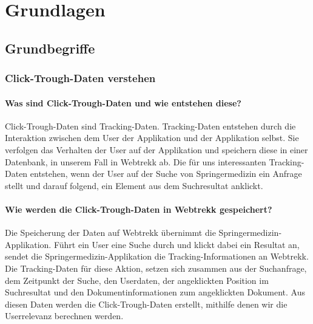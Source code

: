 %
\chapter{Grundlagen}
\label{sec:Grundlagen}

\section{Grundbegriffe}
\label{sec:Grundlagen:Grundbegriffe}

\subsection{Click-Trough-Daten verstehen}
\label{sec:Grundlagen:Grundbegriffe:Click-Trough-Daten}

\subsubsection{Was sind Click-Trough-Daten und wie entstehen diese?}
\label{sec:Grundlagen:Grundbegriffe:Click-Trough-Daten:WasSindClick-Trough-Daten}

Click-Trough-Daten sind Tracking-Daten. Tracking-Daten entstehen durch die Interaktion zwischen dem User der Applikation und der Applikation selbst. Sie verfolgen das Verhalten der User auf der Applikation und speichern diese in einer Datenbank, in unserem Fall in Webtrekk ab. Die für uns interessanten Tracking-Daten entstehen, wenn der User auf der Suche von Springermedizin ein Anfrage stellt und darauf folgend, ein Element aus dem Suchresultat anklickt.

\subsubsection{Wie werden die Click-Trough-Daten in Webtrekk gespeichert?}
\label{sec:Grundlagen:Grundbegriffe:Click-Trough-Daten:SpeichernClick-Trough-Daten}

Die Speicherung der Daten auf Webtrekk übernimmt die Springermedizin-Applikation. Führt ein User eine Suche durch und klickt dabei ein Resultat an, sendet die Springermedizin-Applikation die Tracking-Informationen an Webtrekk. Die Tracking-Daten für diese Aktion, setzen sich zusammen aus der Suchanfrage, dem Zeitpunkt der Suche, den Userdaten, der angeklickten Position im Suchresultat und den Dokumentinformationen zum angeklickten Dokument. Aus diesen Daten werden die Click-Trough-Daten erstellt, mithilfe denen wir die Userrelevanz berechnen werden.

